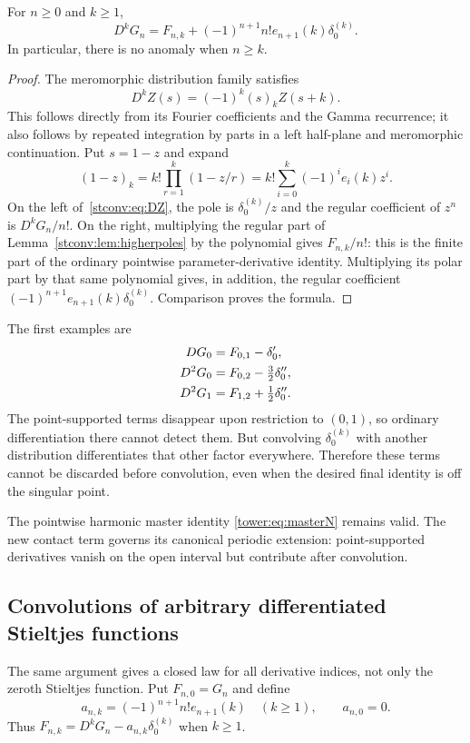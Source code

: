 \begin{theorem}\label{stconv:thm:anomaly}
For $n\ge0$ and $k\ge1$,
\begin{equation}\label{stconv:eq:anomaly}
 D^kG_n=F_{n,k}+(-1)^{n+1}n!e_{n+1}(k)\delta_0^{(k)}.
\end{equation}
In particular, there is no anomaly when $n\ge k$.
\end{theorem}
\begin{proof}
The meromorphic distribution family satisfies
\begin{equation}\label{stconv:eq:DZ}
 D^kZ(s)=(-1)^k(s)_kZ(s+k).
\end{equation}
This follows directly from its Fourier coefficients and the Gamma
recurrence; it also follows by repeated integration by parts in a
left half-plane and meromorphic continuation. Put $s=1-z$ and expand
\[
 (1-z)_k=k!\prod_{r=1}^k(1-z/r)
        =k!\sum_{i=0}^k(-1)^ie_i(k)z^i.
\]
On the left of~\eqref{stconv:eq:DZ}, the pole is $\delta_0^{(k)}/z$ and the
regular coefficient of $z^n$ is $D^kG_n/n!$. On the right, multiplying
the regular part of Lemma~\ref{stconv:lem:higherpoles} by the polynomial gives
$F_{n,k}/n!$: this is the finite part of the ordinary pointwise
parameter-derivative identity. Multiplying its polar part by that same
polynomial gives, in addition, the regular coefficient
$(-1)^{n+1}e_{n+1}(k)\delta_0^{(k)}$. Comparison proves the formula.
\end{proof}

The first examples are
\begin{align}
 DG_0&=F_{0,1}-\delta_0',\label{stconv:eq:anomalylow}\\
 D^2G_0&=F_{0,2}-\tfrac32\delta_0'',\notag\\
 D^2G_1&=F_{1,2}+\tfrac12\delta_0''.\notag
\end{align}
The point-supported terms disappear upon restriction to $(0,1)$, so
ordinary differentiation there cannot detect them. But convolving
$\delta_0^{(k)}$ with another distribution differentiates that other
factor everywhere. Therefore these terms cannot be discarded before
convolution, even when the desired final identity is off the singular
point.

The pointwise harmonic master identity \eqref{tower:eq:masterN} remains
valid. The new contact term governs its canonical periodic extension:
point-supported derivatives vanish on the open interval but contribute
after convolution.

\subsection{Convolutions of arbitrary differentiated Stieltjes functions}
The same argument gives a closed law for all derivative indices, not
only the zeroth Stieltjes function. Put $F_{n,0}=G_n$ and define
\[
 a_{n,k}=(-1)^{n+1}n!e_{n+1}(k)\quad(k\ge1),\qquad a_{n,0}=0.
\]
Thus $F_{n,k}=D^kG_n-a_{n,k}\delta_0^{(k)}$ when $k\ge1$.

